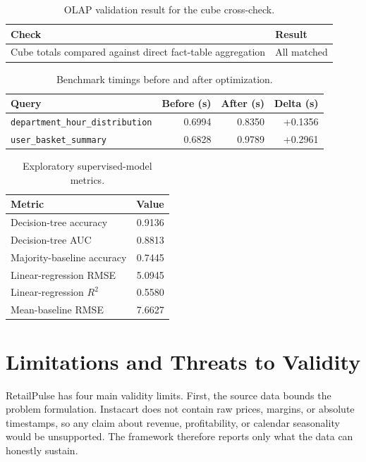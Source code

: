 \documentclass[journal]{IEEEtran}
\begin{document}
\begin{table}[!t]
\caption{OLAP validation result for the cube cross-check.}
\label{tab:olap_validation}
\centering
\footnotesize
\begin{tabular}{p{4.8cm} p{1.9cm}}
\toprule
\textbf{Check} & \textbf{Result} \\
\midrule
Cube totals compared against direct fact-table aggregation & All matched \\
\bottomrule
\end{tabular}
\end{table}

\begin{table}[!t]
\caption{Benchmark timings before and after optimization.}
\label{tab:optimize_summary}
\centering
\footnotesize
\begin{tabular}{p{2.8cm} r r r}
\toprule
\textbf{Query} & \textbf{Before (s)} & \textbf{After (s)} & \textbf{Delta (s)} \\
\midrule
\texttt{department\_hour\_distribution} & 0.6994 & 0.8350 & +0.1356 \\
\texttt{user\_basket\_summary} & 0.6828 & 0.9789 & +0.2961 \\
\bottomrule
\end{tabular}
\end{table}

\begin{table}[!t]
\caption{Exploratory supervised-model metrics.}
\label{tab:exploratory_metrics}
\centering
\footnotesize
\begin{tabular}{p{4.5cm} r}
\toprule
\textbf{Metric} & \textbf{Value} \\
\midrule
Decision-tree accuracy & 0.9136 \\
Decision-tree AUC & 0.8813 \\
Majority-baseline accuracy & 0.7445 \\
Linear-regression RMSE & 5.0945 \\
Linear-regression \(R^2\) & 0.5580 \\
Mean-baseline RMSE & 7.6627 \\
\bottomrule
\end{tabular}
\end{table}

\section{Limitations and Threats to Validity}
RetailPulse has four main validity limits. First, the source data bounds the problem formulation. Instacart does not contain raw prices, margins, or absolute timestamps, so any claim about revenue, profitability, or calendar seasonality would be unsupported. The framework therefore reports only what the data can honestly sustain.
\end{document}
